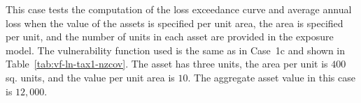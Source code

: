 This case tests the computation of the loss exceedance curve and average annual loss when the value of the assets is specified per unit area, the area is specified per unit, and the number of units in each asset are provided in the exposure model. The vulnerability function used is the same as in Case~1c and shown in Table~\ref{tab:vf-ln-tax1-nzcov}. The asset has three units, the area per unit is $400$ sq. units, and the value per unit area is $10$. The aggregate asset value in this case is $12,000$.